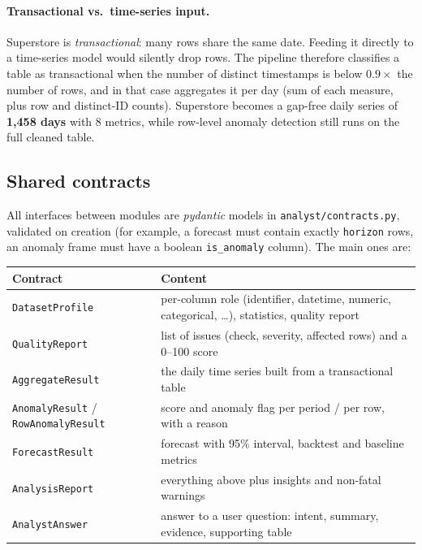 \documentclass[11pt,a4paper]{article}
\newcommand{\code}[1]{\texttt{#1}}
\begin{document}
\paragraph{Transactional vs.\ time-series input.} Superstore is \emph{transactional}: many rows share the same
date. Feeding it directly to a time-series model would silently drop rows. The pipeline therefore classifies a
table as transactional when the number of distinct timestamps is below $0.9\times$ the number of rows, and in that
case aggregates it per day (sum of each measure, plus row and distinct-ID counts). Superstore becomes a gap-free
daily series of \textbf{1{,}458 days} with 8 metrics, while row-level anomaly detection still runs on the full
cleaned table.

\subsection{Shared contracts}\label{sec:contracts}
All interfaces between modules are \emph{pydantic} models in \code{analyst/contracts.py}, validated on creation
(for example, a forecast must contain exactly \code{horizon} rows, an anomaly frame must have a boolean
\code{is\_anomaly} column). The main ones are:

\begin{center}
\small
\begin{tabularx}{\linewidth}{@{}lX@{}}
\toprule
Contract & Content \\
\midrule
\code{DatasetProfile} & per-column role (identifier, datetime, numeric, categorical, \dots), statistics, quality report \\
\code{QualityReport} & list of issues (check, severity, affected rows) and a 0--100 score \\
\code{AggregateResult} & the daily time series built from a transactional table \\
\code{AnomalyResult} / \code{RowAnomalyResult} & score and anomaly flag per period / per row, with a reason \\
\code{ForecastResult} & forecast with 95\% interval, backtest and baseline metrics \\
\code{AnalysisReport} & everything above plus insights and non-fatal warnings \\
\code{AnalystAnswer} & answer to a user question: intent, summary, evidence, supporting table \\
\bottomrule
\end{tabularx}
\end{center}
\end{document}
